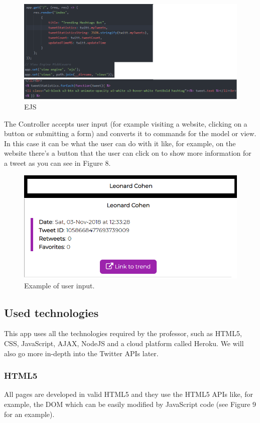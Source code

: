 \documentclass[12pt]{article} %
\begin{document}
\begin{figure}[H] %
\includegraphics[width=1\linewidth]{images/EJS}
\caption{EJS}
\label{EJS}
\end{figure}

\noindent The Controller accepts user input (for example visiting a website, clicking on a button or submitting a form) and converts it to commands for the model or view. In this case it can be what the user can do with it like, for example, on the website there's a button that the user can click on to show more information for a tweet as you can see in Figure 8.

\begin{figure}[H] %
\includegraphics[width=1\linewidth]{images/hashtagButton}
\caption{Example of user input.}
\label{hashtagButton}
\end{figure}

\subsection{Used technologies}
\noindent This app uses all the technologies required by the professor, such as HTML5, CSS, JavaScript, AJAX, NodeJS and a cloud platform called Heroku. We will also go more in-depth into the Twitter APIs later.


  \subsubsection{HTML5  \cite{html5}} All pages are developed in valid HTML5 and they use the HTML5 APIs like, for example, the DOM which can be easily modified by JavaScript code (see Figure 9 for an example).
\end{document}
